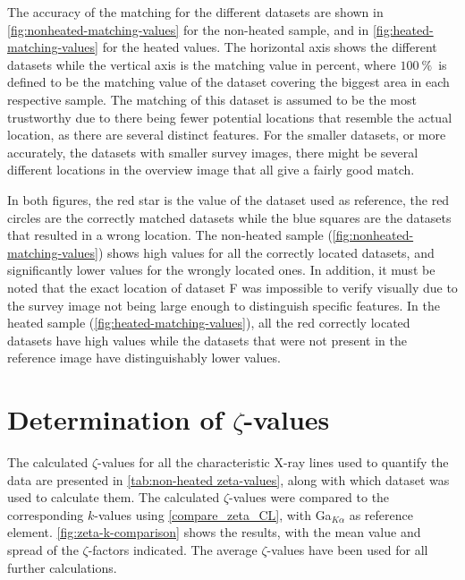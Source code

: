 The accuracy of the matching for the different datasets are shown in \cref{fig:nonheated-matching-values} for the non-heated sample, and in \cref{fig:heated-matching-values} for the heated values. The horizontal axis shows the different datasets while the vertical axis is the matching value in percent, where $\SI{100}{\percent}$ is defined to be the matching value of the dataset covering the biggest area in each respective sample. The matching of this dataset is assumed to be the most trustworthy due to there being fewer potential locations that resemble the actual location, as there are several distinct features. For the smaller datasets, or more accurately, the datasets with smaller survey images, there might be several different locations in the overview image that all give a fairly good match.

In both figures, the red star is the value of the dataset used as reference, the red circles are the correctly matched datasets while the blue squares are the datasets that resulted in a wrong location. The non-heated sample (\cref{fig:nonheated-matching-values}) shows high values for all the correctly located datasets, and significantly lower values for the wrongly located ones. In addition, it must be noted that the exact location of dataset F was impossible to verify visually due to the survey image not being large enough to distinguish specific features. In the heated sample (\cref{fig:heated-matching-values}), all the red correctly located datasets have high values while the datasets that were not present in the reference image have distinguishably lower values.

\section{Determination of $\zeta$-values}

The calculated $\zeta$-values for all the characteristic X-ray lines used to quantify the data are presented in \cref{tab:non-heated zeta-values}, along with which dataset was used to calculate them. The calculated $\zeta$-values were compared to the corresponding $k$-values using \cref{compare_zeta_CL}, with Ga$_{K\alpha}$ as reference element. \cref{fig:zeta-k-comparison} shows the results, with the mean value and spread of the $\zeta$-factors indicated. The average $\zeta$-values have been used for all further calculations. 

